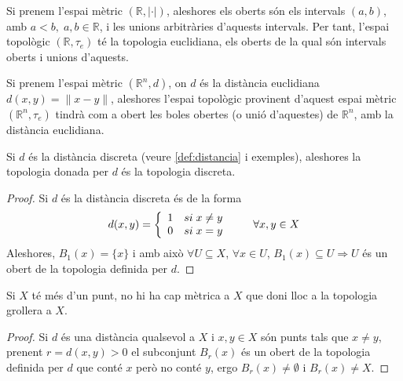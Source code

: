 \documentclass[../main.tex]{subfiles}
\begin{document}
\begin{ej}
\label{ej:topologiausual1} Si prenem l'espai mètric $(\mathbb{R},|\cdotp|)$, aleshores els oberts són els intervals $(a,b)$, amb $a<b,\;a,b\in\mathbb{R}$, i les unions arbitràries d'aquests intervals. Per tant, l'espai topològic $(\mathbb{R},\tau_e)$ té la topologia euclidiana, els oberts de la qual són intervals oberts i unions d'aquests.
\end{ej}

\begin{ej}
\label{ej:topologiausual2} Si prenem l'espai mètric $(\mathbb{R}^n,d)$, on $d$ és la distància euclidiana $d(x,y) = \|x-y\|$, aleshores l'espai topològic provinent d'aquest espai mètric $(\mathbb{R}^n,\tau_e)$ tindrà com a obert les boles obertes (o unió d'aquestes) de $\mathbb{R}^n$, amb la distància euclidiana.
\end{ej}

\begin{nota}
Si $d$ és la distància discreta (veure \ref{def:distancia} i exemples), aleshores la topologia donada per $d$ és la topologia discreta.
\end{nota}
\begin{proof}
Si $d$ és la distància discreta és de la forma
\begin{equation}
    \notag
    d(x,y) = \left\{
    \begin{array}{ll}
        1 & si\;x\not=y \\
        0 & si\;x=y
    \end{array}
    \right. \qquad \forall x,y\in X
\end{equation}
Aleshores, $B_1(x) = \{x\}$ i amb això $\forall U\subseteq X$, $\forall x\in U$, $B_1(x)\subseteq U\Rightarrow U$ és un obert de la topologia definida per $d$.
\end{proof}

\begin{nota}\label{nota:nometricax}
Si $X$ té més d'un punt, no hi ha cap mètrica a $X$ que doni lloc a la topologia grollera a $X$.
\end{nota}
\begin{proof}
Si $d$ és una distància qualsevol a $X$ i $x,y\in X$ són punts tals que $x\not=y$, prenent $r = d(x,y)>0$ el subconjunt $B_r(x)$ és un obert de la topologia definida per $d$ que conté $x$ però no conté $y$, ergo $B_r(x)\not=\emptyset$ i $B_r(x)\not=X$.
\end{proof}
\end{document}
